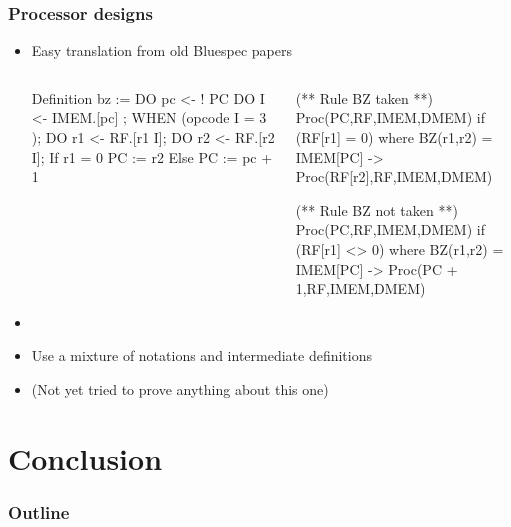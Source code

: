 \documentclass[9pt]{beamer}
\begin{document}
\begin{frame}[fragile]
  \frametitle{Processor designs}
  \begin{itemize}
  \item Easy translation from old Bluespec papers
    \begin{columns}
      \begin{coq}
Definition bz :=
DO pc <- ! PC 
DO I   <- IMEM.[pc] ; 
WHEN (opcode I =  3 );
DO r1 <- RF.[r1 I];
DO r2 <- RF.[r2 I];
If  r1 = 0 { PC := r2 }
Else {PC := pc + 1}
\end{coq}


\begin{coq}
(** Rule BZ taken **)
Proc(PC,RF,IMEM,DMEM) 
if (RF[r1] = 0) where BZ(r1,r2) = IMEM[PC]
-> Proc(RF[r2],RF,IMEM,DMEM)

(** Rule BZ not taken **)
Proc(PC,RF,IMEM,DMEM) 
if (RF[r1] <> 0) where BZ(r1,r2) = IMEM[PC]
-> Proc(PC + 1,RF,IMEM,DMEM)
\end{coq}
\end{columns}

\item {}
\item Use a mixture of notations and intermediate definitions
\item (Not yet tried to prove anything about this one)
\end{itemize}
\end{frame}

\section{Conclusion}
\begin{frame}
  \frametitle{Outline}       
  \tableofcontents [currentsection] 
\end{frame}
\end{document}
